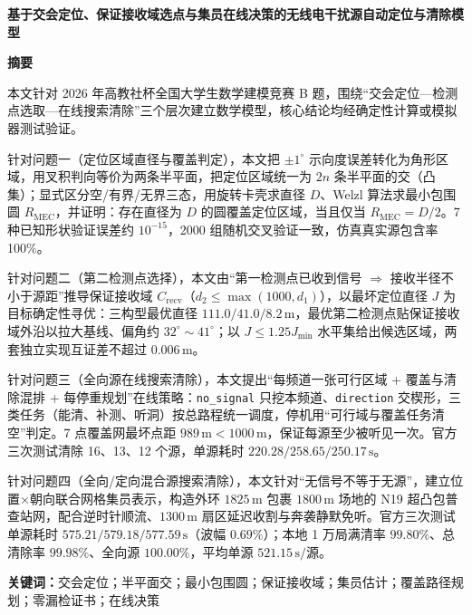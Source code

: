 \documentclass[12pt,a4paper]{article}
\newcommand{\Rmec}{R_{\mathrm{MEC}}}
\newcommand{\Crecv}{C_{\mathrm{recv}}}
\begin{document}
\begin{center}
{\sffamily\bfseries\LARGE 基于交会定位、保证接收域选点与集员在线决策的无线电干扰源自动定位与清除模型}
\end{center}
\vspace{0.55em}

\begin{center}
{\sffamily\bfseries\Large 摘\quad 要}
\end{center}
\vspace{0.25em}
本文针对 2026 年高教社杯全国大学生数学建模竞赛 B 题，围绕“交会定位---检测点选取---在线搜索清除”三个层次建立数学模型，核心结论均经确定性计算或模拟器测试验证。

针对问题一（定位区域直径与覆盖判定），本文把 $\pm 1^{\circ}$ 示向度误差转化为角形区域，用叉积判向等价为两条半平面，把定位区域统一为 $2n$ 条半平面的交（凸集）；显式区分空/有界/无界三态，用旋转卡壳求直径 $D$、Welzl 算法求最小包围圆 $\Rmec$，并证明：存在直径为 $D$ 的圆覆盖定位区域，当且仅当 $\Rmec=D/2$。7 种已知形状验证误差约 $10^{-15}$，2000 组随机交叉验证一致，仿真真实源包含率 100\%。

针对问题二（第二检测点选择），本文由“第一检测点已收到信号 $\Rightarrow$ 接收半径不小于源距”推导保证接收域 $\Crecv$（$d_2\le\max(1000,d_1)$），以最坏定位直径 $J$ 为目标确定性寻优：三构型最优直径 $111.0/41.0/8.2\,\mathrm{m}$，最优第二检测点贴保证接收域外沿以拉大基线、偏角约 $32^{\circ}{\sim}41^{\circ}$；以 $J\le 1.25J_{\min}$ 水平集给出候选区域，两套独立实现互证差不超过 $0.006\,\mathrm{m}$。

针对问题三（全向源在线搜索清除），本文提出“每频道一张可行区域 + 覆盖与清除混排 + 每停重规划”在线策略：\texttt{no\_signal} 只挖本频道、\texttt{direction} 交楔形，三类任务（能清、补测、听洞）按总路程统一调度，停机用“可行域与覆盖任务清空”判定。7 点覆盖网最坏点距 $989\,\mathrm{m}<1000\,\mathrm{m}$，保证每源至少被听见一次。官方三次测试清除 16、13、12 个源，单源耗时 $220.28/258.65/250.17\,\mathrm{s}$。

针对问题四（全向/定向混合源搜索清除），本文针对“无信号不等于无源”，建立位置$\times$朝向联合网格集员表示，构造外环 $1825\,\mathrm{m}$ 包裹 $1800\,\mathrm{m}$ 场地的 N19 超凸包普查站网，配合逆时针顺流、$1300\,\mathrm{m}$ 扇区延迟收割与奔袭静默免听。官方三次测试单源耗时 $575.21/579.18/577.59\,\mathrm{s}$（波幅 $0.69\%$）；本地 1 万局满清率 $99.80\%$、总清除率 $99.98\%$、全向源 $100.00\%$，平均单源 $521.15\,\mathrm{s}/$源。

\vspace{0.35em}
\noindent\textbf{关键词：}交会定位；半平面交；最小包围圆；保证接收域；集员估计；覆盖路径规划；零漏检证书；在线决策
\end{document}
